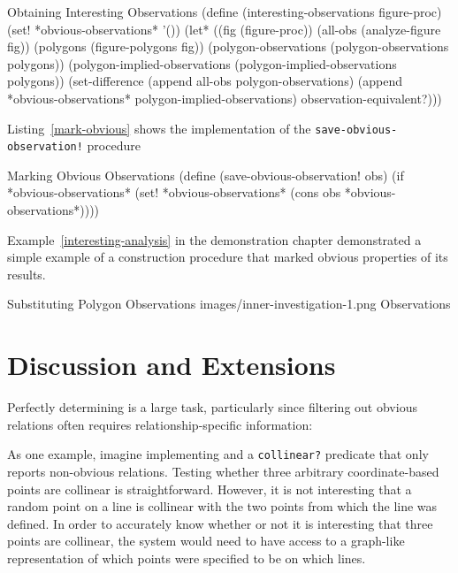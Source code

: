 \newpage

\begin{code-listing}
[label=interesting-obs-impl]
{Obtaining Interesting Observations}
(define (interesting-observations figure-proc)
  (set! *obvious-observations* '())
  (let* ((fig (figure-proc))
         (all-obs (analyze-figure fig))
         (polygons (figure-polygons fig))
         (polygon-observations (polygon-observations polygons))
         (polygon-implied-observations
           (polygon-implied-observations polygons))
    (set-difference (append all-obs polygon-observations)
                    (append *obvious-observations* polygon-implied-observations)
                    observation-equivalent?)))
\end{code-listing}

Listing~\ref{mark-obvious} shows the implementation of the
\texttt{save-obvious-observation!} procedure

\begin{code-listing}
[label=mark-obvious]
{Marking Obvious Observations}
(define (save-obvious-observation! obs)
  (if *obvious-observations*
      (set! *obvious-observations*
            (cons obs *obvious-observations*))))
\end{code-listing}

Example~\ref{interesting-analysis} in the demonstration chapter
demonstrated a simple example of a construction procedure that marked
obvious properties of its results.

\begin{img-example}
[label=cyc-interesting]
{Substituting Polygon Observations}
{images/inner-investigation-1.png}
Observations
\end{img-example}

\section{Discussion and Extensions}

Perfectly determining is a large task, particularly since filtering
out obvious relations often requires relationship-specific information:

As one example, imagine implementing and a \texttt{collinear?}
predicate that only reports non-obvious relations. Testing whether
three arbitrary coordinate-based points are collinear is
straightforward. However, it is not interesting that a random point on
a line is collinear with the two points from which the line was
defined. In order to accurately know whether or not it is interesting
that three points are collinear, the system would need to have access
to a graph-like representation of which points were specified to be on
which lines.

